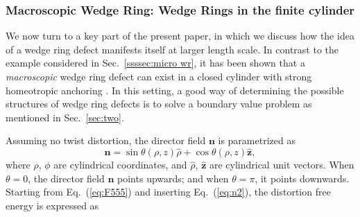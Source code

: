 \documentclass[nottitlepage]{article}
\begin{document}




     \subsubsection{Macroscopic Wedge Ring: Wedge Rings in the finite cylinder}\label{ssssec:micro wrc}

      We now turn to a key part of the present paper, in which we discuss how the idea of a wedge ring defect manifests itself at larger length scale. In contrast to the example considered in Sec.~\ref{ssssec:micro wr}, it has been shown that a {\it macroscopic} wedge ring defect can exist in a closed cylinder with strong homeotropic anchoring \cite{liang}. In this setting, a good way of determining the possible structures of wedge ring defects is to solve a boundary value problem as mentioned in Sec.~\ref{sec:two}.

      Assuming no twist distortion, the director field $\mathbf{n}$ is parametrized as
          \begin{equation}\label{eq:n2}
           \mathbf{n}=\sin\theta(\rho,z)\hat{\rho}+\cos\theta(\rho,z)\hat{\mathbf{z}},
        \end{equation}
       where $\rho$, $\phi$ are cylindrical coordinates, and $\hat{\rho}$, $\hat{\mathbf{z}}$ are cylindrical unit vectors. When $\theta=0$, the director field $\mathbf{n}$ points upwards; and when $\theta=\pi$, it points downwards.
            Starting from Eq.~(\ref{eq:F555}) and inserting Eq.~(\ref{eq:n2}), the distortion free energy is expressed as
\end{document}
